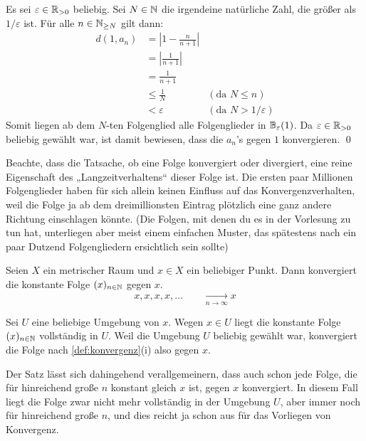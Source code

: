 \begin{bew}
    Es sei $\varepsilon \in \mathbb R_{>0}$ beliebig. Sei $N\in \mathbb N$ die irgendeine natürliche Zahl, die größer als $1/\varepsilon$ ist. Für alle $n\in \mathbb N_{\ge N}$ gilt dann:
    \begingroup
    \allowdisplaybreaks
    \begin{align*}
        d(1,a_n) & = \left| 1-\frac{n}{n+1}\right| \\
        & = \left| \frac{1}{n+1} \right| \\
        & = \frac{1}{n+1} \\
        & \le \frac{1}{N} & (\text{da $N\le n$})\\
        & < \varepsilon & (\text{da $N> 1/\varepsilon$})
    \end{align*}
    \endgroup
    Somit liegen ab dem $N$-ten Folgenglied alle Folgenglieder in $\mathbb B_\varepsilon(1)$. Da $\varepsilon \in \mathbb R_{>0}$ beliebig gewählt war, ist damit bewiesen, dass die $a_n$'s gegen $1$ konvergieren. \qed
\end{bew}


\begin{bem}
    Beachte, dass die Tatsache, ob eine Folge konvergiert oder divergiert, eine reine Eigenschaft des „Langzeitverhaltens“ dieser Folge ist. Die ersten paar Millionen Folgenglieder haben für sich allein keinen Einfluss auf das Konvergenzverhalten, weil die Folge ja ab dem dreimillionsten Eintrag plötzlich eine ganz andere Richtung einschlagen könnte. (Die Folgen, mit denen du es in der Vorlesung zu tun hat, unterliegen aber meist einem einfachen Muster, das spätestens nach ein paar Dutzend Folgengliedern ersichtlich sein sollte)
\end{bem}


\begin{bsp}
    Seien $X$ ein metrischer Raum und $x \in X$ ein beliebiger Punkt. Dann konvergiert die konstante Folge $(x)_{n\in \mathbb N}$ gegen $x$.
        \[ x,x,x,x,\dots \qquad \xrightarrow[n\to \infty]{} x \]
\end{bsp}
    
    
\begin{bew}
    Sei $U$ eine beliebige Umgebung von $x$. Wegen $x\in U$ liegt die konstante Folge $(x)_{n\in \mathbb N}$ vollständig in $U$. Weil die Umgebung $U$ beliebig gewählt war, konvergiert die Folge nach \cref{def:konvergenz}(i) also gegen $x$.
\end{bew}


\begin{bem}
    Der Satz lässt sich dahingehend verallgemeinern, dass auch schon jede Folge, die für hinreichend große $n$ konstant gleich $x$ ist, gegen $x$ konvergiert. In diesem Fall liegt die Folge zwar nicht mehr vollständig in der Umgebung $U$, aber immer noch für hinreichend große $n$, und dies reicht ja schon aus für das Vorliegen von Konvergenz.
\end{bem}


